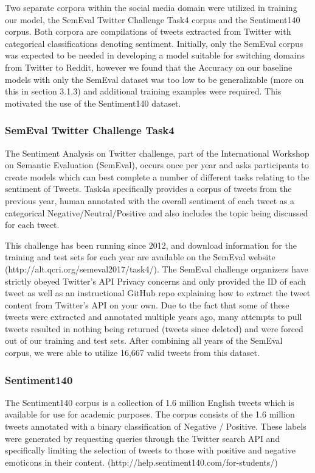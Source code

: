 \documentclass[11pt]{article}
\begin{document}
Two separate corpora within the social media domain were utilized in training our model, the SemEval 
Twitter Challenge Task4 corpus and the Sentiment140 corpus. Both corpora are compilations of tweets 
extracted from Twitter with categorical classifications denoting sentiment. Initially, only the 
SemEval corpus was expected to be needed in developing a model suitable for switching domains from 
Twitter to Reddit, however we found that the Accuracy on our baseline models with only the SemEval 
dataset was too low to be generalizable (more on this in section 3.1.3) and additional 
training examples were required. This motivated the use of the Sentiment140 dataset. 

\subsubsection{SemEval Twitter Challenge Task4}
The Sentiment Analysis on Twitter challenge, part of the International Workshop on Semantic Evaluation 
(SemEval), occurs once per year and asks participants to create models which can best complete a 
number of different tasks relating to the sentiment of Tweets. Task4a specifically provides a corpus 
of tweets from the previous year, human annotated with the overall sentiment of each tweet as a 
categorical Negative/Neutral/Positive and also includes the topic being discussed for each tweet. 

This challenge has been running since 2012, and download information for the training and test sets 
for each year are available on the SemEval website 
(http://alt.qcri.org/semeval2017/task4/). The SemEval challenge organizers 
have strictly obeyed Twitter's API Privacy concerns and only provided the ID of each tweet as well as 
an instructional GitHub repo explaining how to extract the tweet content from Twitter's API on your 
own. Due to the fact that some of these tweets were extracted and annotated multiple years ago, many 
attempts to pull tweets resulted in nothing being returned (tweets since deleted) and were forced out 
of our training and test sets. After combining all years of the SemEval corpus, we were able to 
utilize 16,667 valid tweets from this dataset. 

\subsubsection{Sentiment140}
The Sentiment140 corpus is a collection of 1.6 million English tweets which is available for use for 
academic purposes. The corpus consists of the 1.6 million tweets annotated with a binary 
classification of Negative / Positive. These labels were generated 
by requesting queries through the Twitter search API and specifically limiting the selection of tweets 
to those with positive and negative emoticons in their content. 
(http://help.sentiment140.com/for-students/) 
\end{document}
